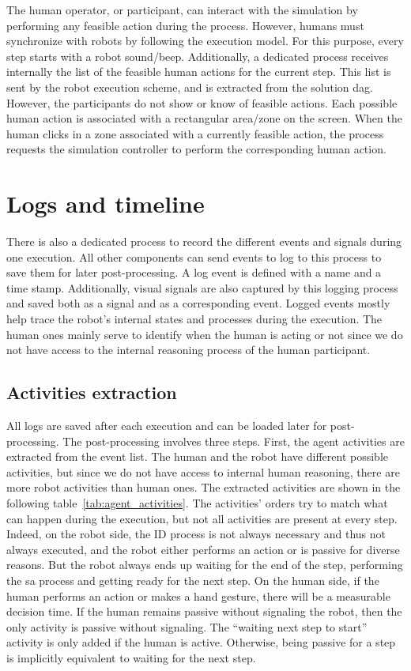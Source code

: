 The human operator, or participant, can interact with the simulation by performing any feasible action during the process. However, humans must synchronize with robots by following the execution model. For this purpose, every step starts with a robot sound/beep. Additionally, a dedicated process receives internally the list of the feasible human actions for the current step. This list is sent by the robot execution scheme, and is extracted from the solution \acrshort{dag}. However, the participants do not show or know of feasible actions.
Each possible human action is associated with a rectangular area/zone on the screen. When the human clicks in a zone associated with a currently feasible action, the process requests the simulation controller to perform the corresponding human action.

\section{Logs and timeline}

There is also a dedicated process to record the different events and signals during one execution. All other components can send events to log to this process to save them for later post-processing. A log event is defined with a name and a time stamp. Additionally, visual signals are also captured by this logging process and saved both as a signal and as a corresponding event. Logged events mostly help trace the robot's internal states and processes during the execution. The human ones mainly serve to identify when the human is acting or not since we do not have access to the internal reasoning process of the human participant. 

\subsection{Activities extraction}

All logs are saved after each execution and can be loaded later for post-processing. The post-processing involves three steps. First, the agent activities are extracted from the event list. The human and the robot have different possible activities, but since we do not have access to internal human reasoning, there are more robot activities than human ones. The extracted activities are shown in the following table~\ref{tab:agent_activities}. The activities' orders try to match what can happen during the execution, but not all activities are present at every step. Indeed, on the robot side, the ID process is not always necessary and thus not always executed, and the robot either performs an action or is passive for diverse reasons. But the robot always ends up waiting for the end of the step, performing the \acrshort{sa} process and getting ready for the next step. On the human side, if the human performs an action or makes a hand gesture, there will be a measurable decision time. If the human remains passive without signaling the robot, then the only activity is passive without signaling. The ``waiting next step to start'' activity is only added if the human is active. Otherwise, being passive for a step is implicitly equivalent to waiting for the next step.  

